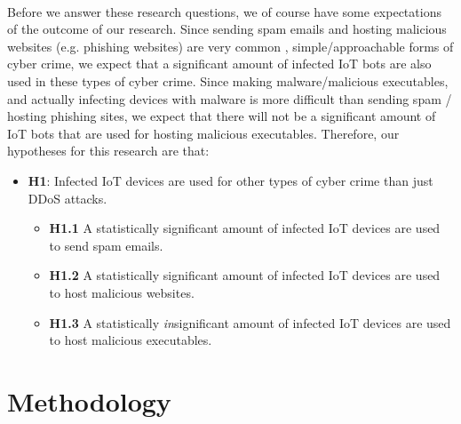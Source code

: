 \documentclass[a4paper,10pt]{article}
\begin{document}
~\\
Before we answer these research questions, we of course have some expectations of the outcome of our research.
Since sending spam emails and hosting malicious websites (e.g. phishing websites) are very common 
\cite{common_cyber_crime},  simple/approachable forms of cyber crime, we expect that a significant amount of 
infected IoT bots are also used in these types of cyber crime. Since making malware/malicious executables, and actually
infecting devices with malware is more difficult than sending spam / hosting phishing sites, we expect that there will not
be a significant amount of IoT bots that are used for hosting malicious executables. Therefore, our hypotheses for this 
research are that:
\begin{itemize}
  \item[] \textbf{H1}: Infected IoT devices are used for other types of cyber crime than just DDoS attacks.
  \begin{itemize}
    \item[] \textbf{H1.1} A statistically significant amount of infected IoT devices are used to send spam emails.
    \item[] \textbf{H1.2} A statistically significant amount of infected IoT devices are used to host malicious websites.
    \item[] \textbf{H1.3} A statistically \textit{in}significant amount of infected IoT devices are used to host malicious 
    executables.
  \end{itemize}
\end{itemize}

\section{Methodology} \label{sec:methodology}
\end{document}
